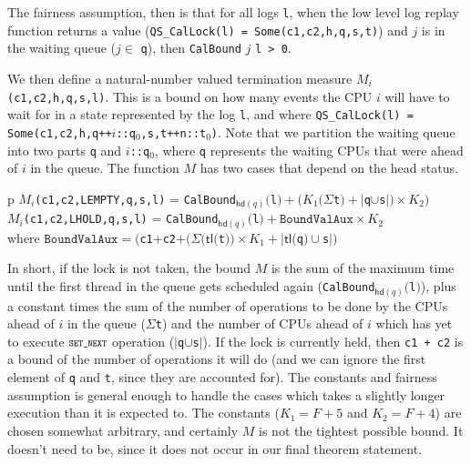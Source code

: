 The fairness assumption, then is that for all logs \lstinline$l$, 
when the low level log replay function returns a 
value (\lstinline$QS_CalLock(l) = Some(c1,c2,h,q,s,t)$) and $j$ is 
in the waiting queue ($j \in$ \lstinline$q$), then \lstinline$CalBound$ $j$ \lstinline$l > 0$. 

We then define a natural-number valued termination measure $M_i$\lstinline$(c1,c2,h,q,s,l)$. 
This is a bound on how many events the CPU $i$ will
have to wait for in a state represented by the log \lstinline$l$, and where
\lstinline$QS_CalLock(l) = Some(c1,c2,h,q++$$i$\lstinline$::q$$_0$\lstinline$,s,t++n::t$$_0$\lstinline$)$. 
Note that
we partition the waiting queue into two parts \lstinline$q$ 
and $i$\lstinline$::q$$_0$, where \lstinline$q$
represents the waiting CPUs that were ahead of $i$ in the queue.
The function $M$ has two cases that depend on the head status.
\begin{center}
\begin{tabular}{p\textwidth}
$M_i$\lstinline$(c1,c2,LEMPTY,q,s,l)$ = \lstinline$CalBound$$_{\mathsf{hd}(q)}($\lstinline$l$$) + (K_1(\Sigma $\lstinline$t$$) + |$\lstinline$q$$\cup $\lstinline$s$$|)\times K_2)$\\
$M_i$\lstinline$(c1,c2,LHOLD,q,s,l)$ = \lstinline$CalBound$$_{\mathsf{hd}(q)}($\lstinline$l$$) + \texttt{BoundValAux}\times K_2$ \\
\hfill	 where $\texttt{BoundValAux} = ($\lstinline$c1$$+$\lstinline$c2$$ + (\Sigma (\mathsf{tl}($\lstinline$t$$)) \times K_1 + |\mathsf{tl}($\lstinline$q$$)\cup $\lstinline$s$$|)$\\
\end{tabular}
\end{center}

In short, if the lock is not taken, the bound $M$ is the sum of the
maximum time until the first thread in the queue gets scheduled again
(\lstinline$CalBound$$_{\mathsf{hd}(q)}($\lstinline$l$$)$), plus a constant times
the sum of the number of operations to be done
by the CPUs ahead of $i$ in the queue ($\Sigma $\lstinline$t$) 
and the number of CPUs ahead of $i$ which has
yet to execute $\SETNEXT$ operation 
($|$\lstinline$q$$ \cup $\lstinline$s$$|$). If the lock is currently
held, then \lstinline$c1 + c2$ is a bound of the number of operations it will
do
(and we can ignore the first element of \lstinline$q$ and \lstinline$t$, since they are
accounted for).
The constants and fairness assumption is general enough to handle the cases which takes a slightly longer execution than it is expected to.
The constants ($K_1 = F+5$ and $K_2 = F+4$) are chosen somewhat
arbitrary, and certainly $M$ is not the tightest possible bound. It
doesn't need to be, since it does not occur in our final theorem
statement.

